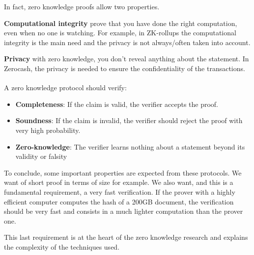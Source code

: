 In fact, zero knowledge proofs allow two properties. 

\textbf{Computational integrity} prove that you have done the right computation, even when no one is watching. For example, in ZK-rollups the computational integrity is the main need and the privacy is not always/often taken into account. 

\textbf{Privacy} with zero knowledge, you don't reveal anything about the statement. In Zerocash\cite{sasson2014zerocash}, the privacy is needed to ensure the confidentiality of the transactions. 


\paragraph{} A zero knowledge protocol should verify:
\begin{itemize}
    \item \textbf{Completeness}: If the claim is valid, the verifier accepts the proof.
\item \textbf{Soundness}: If the claim is invalid, the verifier should reject the proof with very high probability.

\item \textbf{Zero-knowledge}: The verifier learns nothing about a statement beyond its validity or falsity 
\end{itemize}

To conclude, some important properties are expected from these protocols. We want of short proof in terms of size for example. We also want, and this is a fundamental requirement, a very fast verification. If the prover with a highly efficient computer computes the hash of a 200GB document, the verification should be very fast and consists in a much lighter computation than the prover one.

This last requirement is at the heart of the zero knowledge research and explains the complexity of the techniques used.